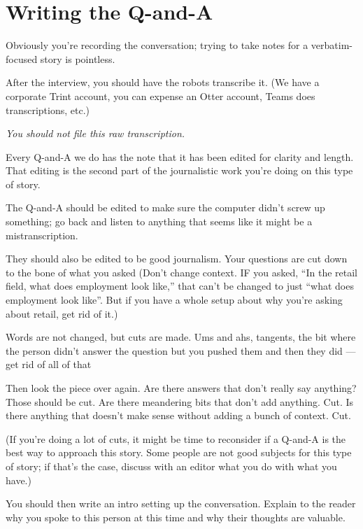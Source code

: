 \documentclass[
  11pt,
  american,
  letterpaperpaper,
  extrafontsizes,onecolumn,openright
  ]{memoir}
\begin{document}
\hypertarget{writing-the-q-and-a}{%
\section*{Writing the Q-and-A}\label{writing-the-q-and-a}}

Obviously you're recording the conversation; trying to take notes for a verbatim-focused story is pointless.

After the interview, you should have the robots transcribe it. (We have a corporate Trint account, you can expense an Otter account, Teams does transcriptions, etc.)

\emph{You should not file this raw transcription.}

Every Q-and-A we do has the note that it has been edited for clarity and length. That editing is the second part of the journalistic work you're doing on this type of story.

The Q-and-A should be edited to make sure the computer didn't screw up something; go back and listen to anything that seems like it might be a mistranscription.

They should also be edited to be good journalism. Your questions are cut down to the bone of what you asked (Don't change context. IF you asked, \enquote{In the retail field, what does employment look like,} that can't be changed to just \enquote{what does employment look like}. But if you have a whole setup about why you're asking about retail, get rid of it.)

Words are not changed, but cuts are made. Ums and ahs, tangents, the bit where the person didn't answer the question but you pushed them and then they did --- get rid of all of that

Then look the piece over again. Are there answers that don't really say anything? Those should be cut. Are there meandering bits that don't add anything. Cut. Is there anything that doesn't make sense without adding a bunch of context. Cut.

(If you're doing a lot of cuts, it might be time to reconsider if a Q-and-A is the best way to approach this story. Some people are not good subjects for this type of story; if that's the case, discuss with an editor what you do with what you have.)

You should then write an intro setting up the conversation. Explain to the reader why you spoke to this person at this time and why their thoughts are valuable.
\end{document}
